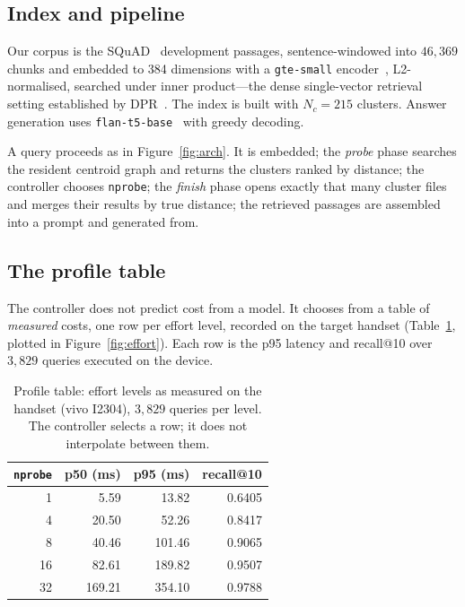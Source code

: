 \documentclass[conference]{IEEEtran}
\begin{document}
\subsection{Index and pipeline}

Our corpus is the SQuAD~\cite{rajpurkar2016squad} development passages,
sentence-windowed into $46{,}369$ chunks and embedded to 384 dimensions with a
\texttt{gte-small} encoder~\cite{li2023gte}, L2-normalised, searched under
inner product---the dense single-vector retrieval setting established by
DPR~\cite{karpukhin2020dpr}. The index is built with $N_c = 215$ clusters.
Answer generation uses \texttt{flan-t5-base}~\cite{chung2024flan} with greedy
decoding.

A query proceeds as in Figure~\ref{fig:arch}. It is embedded; the
\emph{probe} phase searches the resident centroid graph and returns the
clusters ranked by distance; the controller chooses \texttt{nprobe}; the
\emph{finish} phase opens exactly that many cluster files and merges their
results by true distance; the retrieved passages are assembled into a prompt
and generated from.

\subsection{The profile table}

The controller does not predict cost from a model. It chooses from a table of
\emph{measured} costs, one row per effort level, recorded on the target handset
(Table~\ref{tab:profile}, plotted in Figure~\ref{fig:effort}). Each row is the
p95 latency and recall@10 over $3{,}829$ queries executed on the device.

\begin{table}[t]
\caption{Profile table: effort levels as measured on the handset (vivo I2304),
$3{,}829$ queries per level. The controller selects a row; it does not
interpolate between them.}
\label{tab:profile}
\centering
\begin{tabular}{rrrr}
\toprule
\texttt{nprobe} & p50 (ms) & p95 (ms) & recall@10 \\
\midrule
1  & 5.59   & 13.82  & 0.6405 \\
4  & 20.50  & 52.26  & 0.8417 \\
8  & 40.46  & 101.46 & 0.9065 \\
16 & 82.61  & 189.82 & 0.9507 \\
32 & 169.21 & 354.10 & 0.9788 \\
\bottomrule
\end{tabular}
\end{table}
\end{document}
